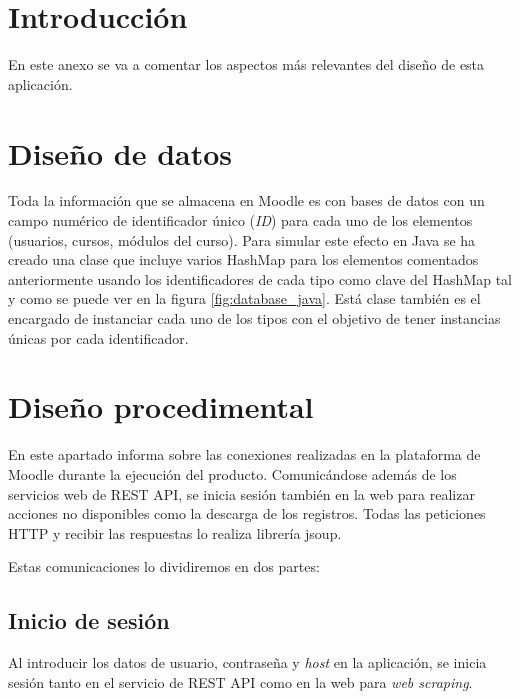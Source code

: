 
\section{Introducción}

En este anexo se va a comentar los aspectos más relevantes del diseño de esta aplicación.

\section{Diseño de datos}

Toda la información que se almacena en Moodle es con bases de datos con un campo numérico de identificador único (\textit{ID}) para cada uno de los elementos (usuarios, cursos, módulos del curso). Para simular este efecto en Java se ha creado una clase que incluye varios HashMap para los elementos comentados anteriormente usando los identificadores de cada tipo como clave del HashMap tal y como se puede ver en la figura \ref{fig:database_java}. Está clase también es el encargado de instanciar cada uno de los tipos con el objetivo de tener instancias únicas por cada identificador.



\section{Diseño procedimental}

En este apartado informa sobre las conexiones realizadas en la plataforma de Moodle durante la ejecución del producto. Comunicándose además de los servicios web de REST API, se inicia sesión también en la web para realizar acciones no disponibles como la descarga de los registros. Todas las peticiones HTTP y recibir las respuestas lo realiza librería jsoup.

Estas comunicaciones lo dividiremos en dos partes:

\subsection{Inicio de sesión}

Al introducir los datos de usuario, contraseña y \textit{host} en la aplicación, se inicia sesión tanto en el servicio de REST API como en la web para \textit{web scraping}.

